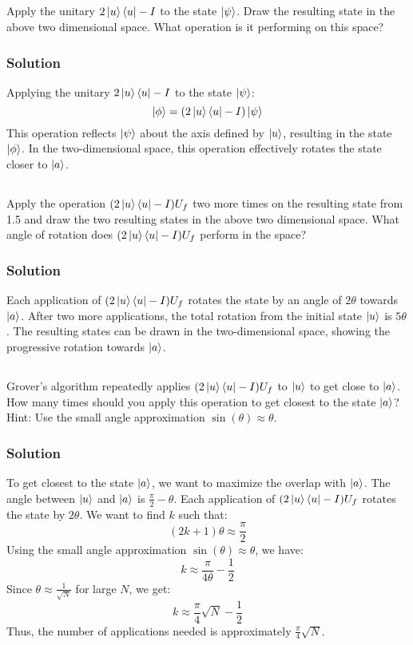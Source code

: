 \documentclass[12pt]{article} %
\begin{document}
\subsection{}
Apply the unitary \(2\ket{u}\bra{u} - I\) to the state \(\ket{\psi}\). Draw the resulting state in the above two dimensional space. What operation is it performing on this space?
\subsubsection*{Solution}
Applying the unitary \(2\ket{u}\bra{u} - I\) to the state \(\ket{\psi}\):
\[\ket{\phi} = (2\ket{u}\bra{u} - I)\ket{\psi}\]
This operation reflects \(\ket{\psi}\) about the axis defined by \(\ket{u}\), resulting in the state \(\ket{\phi}\). In the two-dimensional space, this operation effectively rotates the state closer to \(\ket{a}\).  

\subsection{}
Apply the operation \((2\ket{u}\bra{u} - I)U_f\) two more times on the resulting state from 1.5 and draw the two resulting states in the above two dimensional space. What angle of rotation does \((2\ket{u}\bra{u} - I)U_f\) perform in the space?
\subsubsection*{Solution}
Each application of \((2\ket{u}\bra{u} - I)U_f\) rotates the state by an angle of \(2\theta\) towards \(\ket{a}\). After two more applications, the total rotation from the initial state \(\ket{u}\) is \(5\theta\). The resulting states can be drawn in the two-dimensional space, showing the progressive rotation towards \(\ket{a}\).

\subsection{}
Grover's algorithm repeatedly applies \((2\ket{u}\bra{u} - I)U_f\) to \(\ket{u}\) to get close to \(\ket{a}\). How many times should you apply this operation to get closest to the state \(\ket{a}\)?
\noindent Hint: Use the small angle approximation \(\sin(\theta) \approx \theta\).
\subsubsection*{Solution}
To get closest to the state \(\ket{a}\), we want to maximize the overlap with \(\ket{a}\). The angle between \(\ket{u}\) and \(\ket{a}\) is \(\frac{\pi}{2} - \theta\). Each application of \((2\ket{u}\bra{u} - I)U_f\) rotates the state by \(2\theta\). We want to find \(k\) such that:
\[(2k + 1)\theta \approx \frac{\pi}{2}\]
Using the small angle approximation \(\sin(\theta) \approx \theta\), we have:
\[k \approx \frac{\pi}{4\theta} - \frac{1}{2}\]
Since \(\theta \approx \frac{1}{\sqrt{N}}\) for large \(N\), we get:
\[k \approx \frac{\pi}{4} \sqrt{N} - \frac{1}{2}\]
Thus, the number of applications needed is approximately \(\frac{\pi}{4} \sqrt{N}\).
\end{document}
